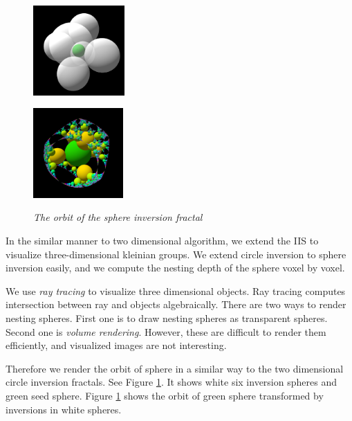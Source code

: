 \begin{figure}[htbp]
 \begin{minipage}[t]{0.5\hsize}
  \center
  \includegraphics[height=1.35in, keepaspectratio]{img/preparation/3dExtension/3dKissingGenerator.png}
  \label{fig:simpleGen}
  \hspace*{\fill}
 \end{minipage}
 \begin{minipage}[t]{0.5\hsize}
  \center
  \includegraphics[height=1.35in, keepaspectratio]{img/preparation/3dExtension/3dOrbit.png}
  \label{fig:simpleOrb}
  \hspace*{\fill}
 \end{minipage}
 \caption{\textit{The orbit of the sphere inversion fractal}}
 \label{fig:simpleGenOrb}
\end{figure}

In the similar manner to two dimensional algorithm,
we extend the IIS to visualize three-dimensional kleinian groups.
We extend circle inversion to sphere inversion easily, and we
compute the nesting depth of the sphere voxel by voxel.

We use \textit{ray tracing} to visualize three dimensional objects.
Ray tracing computes intersection between ray and objects algebraically.
There are two ways to render nesting spheres. First one is to draw
nesting spheres as transparent spheres.
Second one is \textit{volume rendering}.
However, these are difficult to render them efficiently, and
visualized images are not interesting.

Therefore we render the orbit of sphere in a similar way to the two
dimensional circle inversion fractals.
See Figure \ref{fig:simpleGenOrb}. It shows
white six inversion spheres and green seed sphere.
Figure \ref{fig:simpleGenOrb} shows the orbit of
green sphere transformed by inversions in white spheres.

